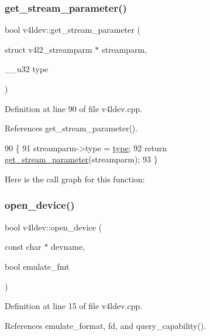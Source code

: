 \subsubsection{\texorpdfstring{get\+\_\+stream\+\_\+parameter()}{get\_stream\_parameter()}\hspace{0.1cm}{\footnotesize\ttfamily [2/2]}}
{\footnotesize\ttfamily bool v4ldev\+::get\+\_\+stream\+\_\+parameter (\begin{DoxyParamCaption}\item[{struct v4l2\+\_\+streamparm $\ast$}]{streamparm,  }\item[{\+\_\+\+\_\+u32}]{type }\end{DoxyParamCaption})}



Definition at line 90 of file v4ldev.\+cpp.



References get\+\_\+stream\+\_\+parameter().


\begin{DoxyCode}
90                                                                                  \{
91     streamparm->type = \hyperlink{classstd_1_1conditional_1_1type}{type};
92     \textcolor{keywordflow}{return} \hyperlink{classv4ldev_ab8ab5bfdaf0ffe3bcf6638dc7465494b}{get\_stream\_parameter}(streamparm);
93 \}
\end{DoxyCode}
Here is the call graph for this function\+:
\mbox{\label{classv4ldev_a56dc3abadfc1de069eb973ff4a6dbd1f}} 
\subsubsection{\texorpdfstring{open\+\_\+device()}{open\_device()}}
{\footnotesize\ttfamily bool v4ldev\+::open\+\_\+device (\begin{DoxyParamCaption}\item[{const char $\ast$}]{devname,  }\item[{bool}]{emulate\+\_\+fmt }\end{DoxyParamCaption})}



Definition at line 15 of file v4ldev.\+cpp.



References emulate\+\_\+format, fd, and query\+\_\+capability().


